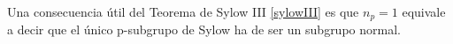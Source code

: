 
\begin{remark} \label{coment}
Una consecuencia útil del Teorema de Sylow III \ref{sylowIII} es que $n_p=1$ equivale a decir que el único p-subgrupo de Sylow ha de ser un subgrupo normal.
\end{remark}



